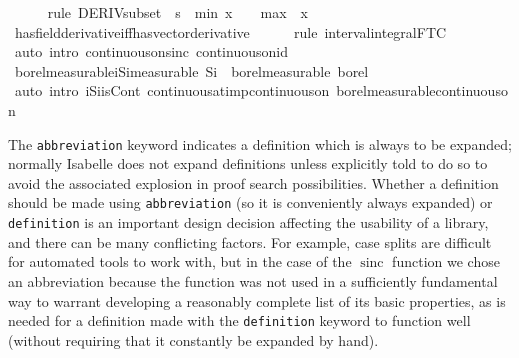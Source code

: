 \documentclass{article}
\theoremstyle{definition}
\newcommand\sinc{\mathop{\text{sinc}}\nolimits}
\begin{document}
\begin{isabellebody}
\ \ \ \ \isamarkupfalse%
\ {\isacharparenleft}rule\ DERIV{\isacharunderscore}subset\ {\isacharbrackleft}\ s\ {\isacharequal}\ {\isachardoublequoteopen}{\isacharbraceleft}{\isacharparenleft}min\ {\isacharparenleft}x\ {\isacharminus}\ {}{\isacharparenright}\ {\isacharparenleft}{\isacharminus}\ {}{\isacharparenright}{\isacharparenright}{\isachardot}{\isachardot}{\isacharparenleft}max\ {}\ {\isacharparenleft}x{\isacharplus}{}{\isacharparenright}{\isacharparenright}{\isacharbraceright}{\isachardoublequoteclose}{\isacharbrackright}{\isacharparenright}\isanewline
\ \ \ \ \isamarkupfalse%
\ has{\isacharunderscore}field{\isacharunderscore}derivative{\isacharunderscore}iff{\isacharunderscore}has{\isacharunderscore}vector{\isacharunderscore}derivative\isanewline
\ \ \ \ \isamarkupfalse%
\ {\isacharparenleft}rule\ interval{\isacharunderscore}integral{\isacharunderscore}FTC{}{\isacharparenright}\isanewline
\ \ \ \ \isamarkupfalse%
\ {\isacharparenleft}auto\ intro{\isacharbang}{\isacharcolon}\ continuous{\isacharunderscore}on{\isacharunderscore}sinc\ continuous{\isacharunderscore}on{\isacharunderscore}id{\isacharparenright}\isanewline
{}\isamarkupfalse%
\isanewline
{}\isamarkupfalse%
\ borel{\isacharunderscore}measurable{\isacharunderscore}iSi{\isacharbrackleft}measurable{\isacharbrackright}{\isacharcolon}\ {\isachardoublequoteopen}Si\ {\isasymin}\ borel{\isacharunderscore}measurable\ borel{\isachardoublequoteclose}\isanewline
{}\isamarkupfalse%
\ {\isacharparenleft}auto\ intro{\isacharcolon}\ iSi{\isacharunderscore}isCont\ continuous{\isacharunderscore}at{\isacharunderscore}imp{\isacharunderscore}continuous{\isacharunderscore}on\ borel{\isacharunderscore}measurable{\isacharunderscore}continuous{\isacharunderscore}on{}{\isacharparenright}
\end{isabellebody}

\medskip

The \texttt{abbreviation} keyword indicates a definition which is always to be expanded; normally Isabelle does not expand definitions unless explicitly told to do so to avoid the associated explosion in proof search possibilities. Whether a definition should be made using \texttt{abbreviation} (so it is conveniently always expanded) or \texttt{definition} is an important design decision affecting the usability of a library, and there can be many conflicting factors. For example, case splits are difficult for automated tools to work with, but in the case of the $\sinc$ function we chose an abbreviation because the function was not used in a sufficiently fundamental way to warrant developing a reasonably complete list of its basic properties, as is needed for a definition made with the \texttt{definition} keyword to function well (without requiring that it constantly be expanded by hand).
\end{document}
